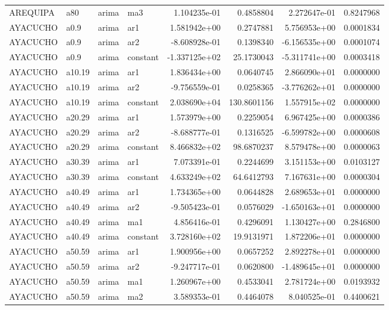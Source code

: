 \documentclass[
]{article}
\begin{document}
\begin{table}[!h]
\begin{tabular}[t]{llllrrrr}
AREQUIPA & a80 & arima & ma3 & 1.104235e-01 & 0.4858804 & 2.272647e-01 & 0.8247968\\
\addlinespace
AYACUCHO & a0.9 & arima & ar1 & 1.581942e+00 & 0.2747881 & 5.756953e+00 & 0.0001834\\
AYACUCHO & a0.9 & arima & ar2 & -8.608928e-01 & 0.1398340 & -6.156535e+00 & 0.0001074\\
AYACUCHO & a0.9 & arima & constant & -1.337125e+02 & 25.1730043 & -5.311741e+00 & 0.0003418\\
AYACUCHO & a10.19 & arima & ar1 & 1.836434e+00 & 0.0640745 & 2.866090e+01 & 0.0000000\\
AYACUCHO & a10.19 & arima & ar2 & -9.756559e-01 & 0.0258365 & -3.776262e+01 & 0.0000000\\
\addlinespace
AYACUCHO & a10.19 & arima & constant & 2.038690e+04 & 130.8601156 & 1.557915e+02 & 0.0000000\\
AYACUCHO & a20.29 & arima & ar1 & 1.573979e+00 & 0.2259054 & 6.967425e+00 & 0.0000386\\
AYACUCHO & a20.29 & arima & ar2 & -8.688777e-01 & 0.1316525 & -6.599782e+00 & 0.0000608\\
AYACUCHO & a20.29 & arima & constant & 8.466832e+02 & 98.6870237 & 8.579478e+00 & 0.0000063\\
AYACUCHO & a30.39 & arima & ar1 & 7.073391e-01 & 0.2244699 & 3.151153e+00 & 0.0103127\\
\addlinespace
AYACUCHO & a30.39 & arima & constant & 4.633249e+02 & 64.6412793 & 7.167631e+00 & 0.0000304\\
AYACUCHO & a40.49 & arima & ar1 & 1.734365e+00 & 0.0644828 & 2.689653e+01 & 0.0000000\\
AYACUCHO & a40.49 & arima & ar2 & -9.505423e-01 & 0.0576029 & -1.650163e+01 & 0.0000000\\
AYACUCHO & a40.49 & arima & ma1 & 4.856416e-01 & 0.4296091 & 1.130427e+00 & 0.2846800\\
AYACUCHO & a40.49 & arima & constant & 3.728160e+02 & 19.9131971 & 1.872206e+01 & 0.0000000\\
\addlinespace
AYACUCHO & a50.59 & arima & ar1 & 1.900956e+00 & 0.0657252 & 2.892278e+01 & 0.0000000\\
AYACUCHO & a50.59 & arima & ar2 & -9.247717e-01 & 0.0620800 & -1.489645e+01 & 0.0000000\\
AYACUCHO & a50.59 & arima & ma1 & 1.260967e+00 & 0.4533041 & 2.781724e+00 & 0.0193932\\
AYACUCHO & a50.59 & arima & ma2 & 3.589353e-01 & 0.4464078 & 8.040525e-01 & 0.4400621\\

\end{tabular}
\end{table}
\end{document}
